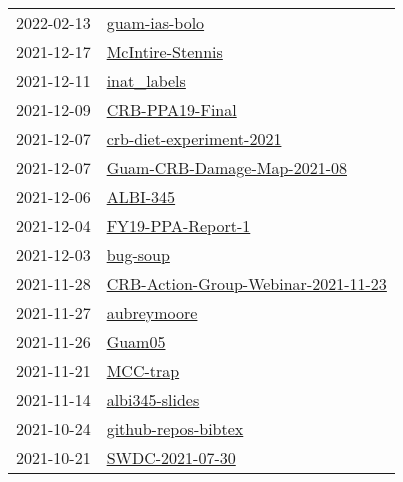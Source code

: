 \begin{longtable}{ll}
2022-02-13 &                                               \href{https://github.com/aubreymoore/guam-ias-bolo}{guam-ias-bolo} \\
2021-12-17 &                                         \href{https://github.com/aubreymoore/McIntire-Stennis}{McIntire-Stennis} \\
2021-12-11 &                                                   \href{https://github.com/aubreymoore/inat_labels}{inat_labels} \\
2021-12-09 &                                           \href{https://github.com/aubreymoore/CRB-PPA19-Final}{CRB-PPA19-Final} \\
2021-12-07 &                         \href{https://github.com/aubreymoore/crb-diet-experiment-2021}{crb-diet-experiment-2021} \\
2021-12-07 &                   \href{https://github.com/aubreymoore/Guam-CRB-Damage-Map-2021-08}{Guam-CRB-Damage-Map-2021-08} \\
2021-12-06 &                                                         \href{https://github.com/aubreymoore/ALBI-345}{ALBI-345} \\
2021-12-04 &                                       \href{https://github.com/aubreymoore/FY19-PPA-Report-1}{FY19-PPA-Report-1} \\
2021-12-03 &                                                         \href{https://github.com/aubreymoore/bug-soup}{bug-soup} \\
2021-11-28 &   \href{https://github.com/aubreymoore/CRB-Action-Group-Webinar-2021-11-23}{CRB-Action-Group-Webinar-2021-11-23} \\
2021-11-27 &                                                   \href{https://github.com/aubreymoore/aubreymoore}{aubreymoore} \\
2021-11-26 &                                                             \href{https://github.com/aubreymoore/Guam05}{Guam05} \\
2021-11-21 &                                                         \href{https://github.com/aubreymoore/MCC-trap}{MCC-trap} \\
2021-11-14 &                                             \href{https://github.com/aubreymoore/albi345-slides}{albi345-slides} \\
2021-10-24 &                                   \href{https://github.com/aubreymoore/github-repos-bibtex}{github-repos-bibtex} \\
2021-10-21 &                                           \href{https://github.com/aubreymoore/SWDC-2021-07-30}{SWDC-2021-07-30} \\

\end{longtable}
